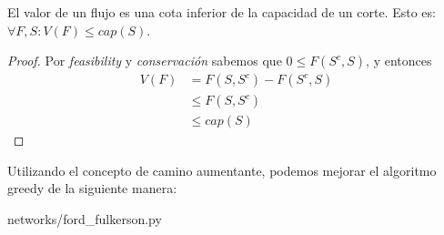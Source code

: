 \begin{corollary}
  El valor de un flujo es una cota inferior de la capacidad de un corte.
  Esto es: $\forall F, S \colon V(F) \le cap(S)$.
\end{corollary}

\begin{proof}
  Por \emph{feasibility} y \emph{conservación} sabemos que
  $0 \le F(S^c, S)$, y entonces
  \begin{align}
    V(F)
    &= F(S, S^c) - F(S^c, S)\\
	  &\le F(S, S^c)\\
    &\le cap(S)
  \end{align}
\end{proof}

\begin{definition}
  Utilizando el concepto de camino aumentante, podemos mejorar el
  algoritmo greedy de la siguiente manera:
  
  \begin{lstinputlisting}[language=python]{networks/ford_fulkerson.py}
  \end{lstinputlisting}
\end{definition}

